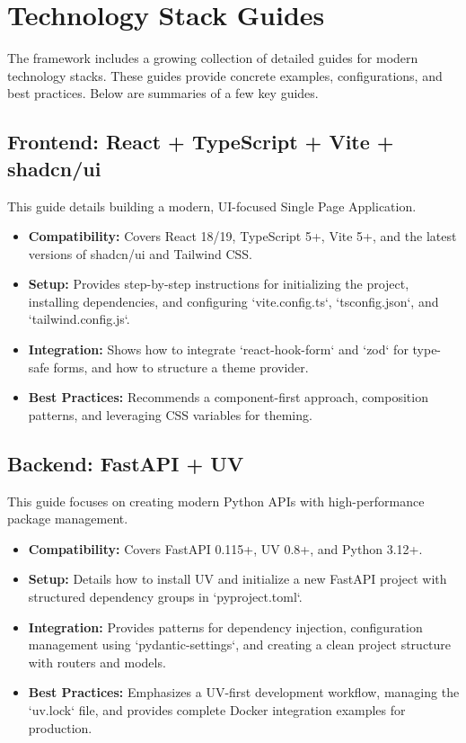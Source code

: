 \documentclass[preprint,12pt]{elsarticle}
\begin{document}
\section{Technology Stack Guides}
The framework includes a growing collection of detailed guides for modern technology stacks. These guides provide concrete examples, configurations, and best practices. Below are summaries of a few key guides.

\subsection{Frontend: React + TypeScript + Vite + shadcn/ui}
This guide details building a modern, UI-focused Single Page Application.
\begin{itemize}
    \item \textbf{Compatibility:} Covers React 18/19, TypeScript 5+, Vite 5+, and the latest versions of shadcn/ui and Tailwind CSS.
    \item \textbf{Setup:} Provides step-by-step instructions for initializing the project, installing dependencies, and configuring `vite.config.ts`, `tsconfig.json`, and `tailwind.config.js`.
    \item \textbf{Integration:} Shows how to integrate `react-hook-form` and `zod` for type-safe forms, and how to structure a theme provider.
    \item \textbf{Best Practices:} Recommends a component-first approach, composition patterns, and leveraging CSS variables for theming.
\end{itemize}

\subsection{Backend: FastAPI + UV}
This guide focuses on creating modern Python APIs with high-performance package management.
\begin{itemize}
    \item \textbf{Compatibility:} Covers FastAPI 0.115+, UV 0.8+, and Python 3.12+.
    \item \textbf{Setup:} Details how to install UV and initialize a new FastAPI project with structured dependency groups in `pyproject.toml`.
    \item \textbf{Integration:} Provides patterns for dependency injection, configuration management using `pydantic-settings`, and creating a clean project structure with routers and models.
    \item \textbf{Best Practices:} Emphasizes a UV-first development workflow, managing the `uv.lock` file, and provides complete Docker integration examples for production.
\end{itemize}
\end{document}
